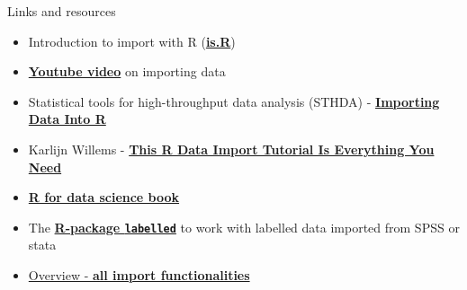 \documentclass[
  10pt,
  ignorenonframetext,
]{beamer}
\begin{document}
\begin{frame}[fragile]{Links and resources}
\protect\hypertarget{links-and-resources}{}

\begin{itemize}
\item
  Introduction to import with R
  (\href{http://is-r.tumblr.com/post/37181850668/reading-writing-stata-dta-files-with-foreign}{\textbf{is.R}})
\item
  \href{https://www.youtube.com/watch?v=WWY8VPh6ryo}{\textbf{Youtube
  video}} on importing data
\item
  Statistical tools for high-throughput data analysis (STHDA) -
  \href{http://www.sthda.com/english/wiki/importing-data-into-r}{\textbf{Importing
  Data Into R}}
\item
  Karlijn Willems -
  \href{https://www.datacamp.com/community/tutorials/r-data-import-tutorial}{\textbf{This
  R Data Import Tutorial Is Everything You Need}}
\item
  \href{https://r4ds.had.co.nz/data-import.html}{\textbf{R for data
  science book}}
\item
  The
  \href{https://cran.r-project.org/web/packages/labelled/labelled.pdf}{\textbf{R-package
  \texttt{labelled}}} to work with labelled data imported from SPSS or
  stata
\item
  \href{https://cran.r-project.org/doc/manuals/r-release/R-data.html}{Overview
  - \textbf{all import functionalities}}
\end{itemize}

\end{frame}
\end{document}
